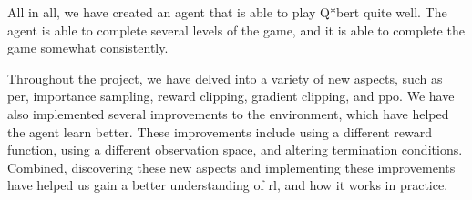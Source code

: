 All in all, we have created an agent that is able to play Q*bert quite well.
The agent is able to complete several levels of the game, and it is able to
complete the game somewhat consistently.

Throughout the project, we have delved into a variety of new aspects, such as
\gls{per}, importance sampling, reward clipping, gradient clipping, and
\gls{ppo}. We have also implemented several improvements to the environment,
which have helped the agent learn better. These improvements include using a
different reward function, using a different observation space, and altering
termination conditions. Combined, discovering these new aspects and
implementing these improvements have helped us gain a better understanding of
\gls{rl}, and how it works in practice.
